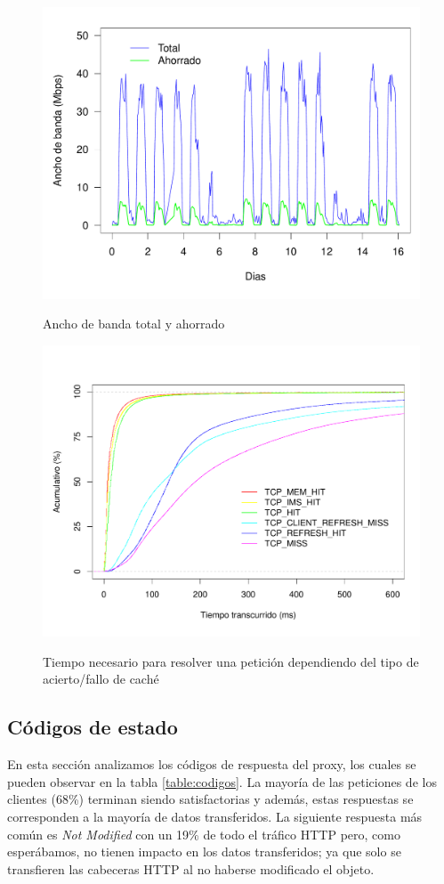 \documentclass[twocolumn]{Jornadas}
\begin{document}
\begin{figure}[ht!]
\includegraphics[scale=0.29]{figures/Bandwidth_full.pdf}\label{fig:ahorrado}
\caption{Ancho de banda total y ahorrado}
\label{fig:ahorrado}
\end{figure}

\begin{figure}[ht!]
\includegraphics[scale=0.30]{figures/ElapsedTimeAll_1k_full.pdf} \label{fig:elapsed}
\caption{Tiempo necesario para resolver una petición dependiendo del tipo de acierto/fallo de caché}
\label{fig:elapsed}
\end{figure}

\subsection{Códigos de estado}
En esta sección analizamos los códigos de respuesta del proxy, los cuales se pueden observar en la tabla \ref{table:codigos}. La mayoría de las peticiones de los clientes (68\%) terminan siendo satisfactorias y además, estas respuestas se corresponden a la mayoría de datos transferidos. La siguiente respuesta más común es \textit{Not Modified} con un 19\% de todo el tráfico HTTP pero, como esperábamos, no tienen impacto en los datos transferidos; ya que solo se transfieren las cabeceras HTTP al no haberse modificado el objeto.
\end{document}
